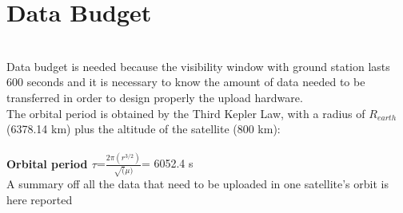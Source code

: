 \documentclass[a4paper,12pt]{article}
\begin{document}
\section*{Data Budget}
\
\\
Data budget is needed because the visibility window with ground station lasts 600 seconds and it is necessary to know the amount of data needed to be transferred in order to design properly the upload hardware.
\\
The orbital period is obtained by the Third Kepler Law, with a radius of $R_{earth}$(6378.14 km) plus the altitude of the satellite (800 km):
\\
\\
\textbf{Orbital period $\tau$}=$\tfrac{2\pi (r^{3/2})}{\sqrt(\mu)}$= 6052.4 s
\\
A summary off all the data that need to be uploaded in one satellite's orbit is here reported
\end{document}
